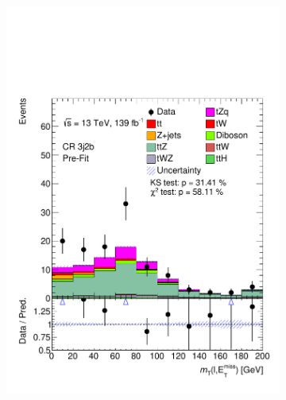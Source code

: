\begin{figure}[!h]
\begin{subfigure}[b]{0.33\linewidth}
    \includegraphics[width=\linewidth]{ubonn-thesis/Chapters/Chapters_06/Figure/Input_distribution/CR_3j2b_mtW.pdf} 
  \end{subfigure}
  \begin{subfigure}[b]{0.33\linewidth}
    \centering

\end{subfigure}
\end{figure}

